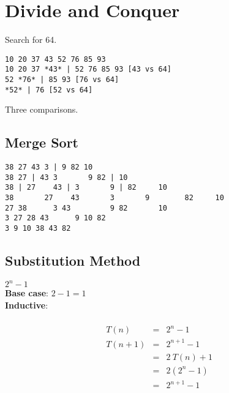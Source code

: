 \documentclass{article}
\begin{document}
\setcounter{section}{2}
\section{Divide and Conquer}
Search for 64.
\begin{verbatim}
10 20 37 43 52 76 85 93
10 20 37 *43* | 52 76 85 93 [43 vs 64]
52 *76* | 85 93 [76 vs 64]
*52* | 76 [52 vs 64]
\end{verbatim}

Three comparisons.

\subsection{Merge Sort}
\begin{verbatim}
38 27 43 3 | 9 82 10
38 27 | 43 3       9 82 | 10
38 | 27    43 | 3       9 | 82     10
38       27    43       3       9        82     10
27 38      3 43         9 82       10
3 27 28 43      9 10 82
3 9 10 38 43 82
\end{verbatim}

\subsection{Substitution Method}
$2^n-1$ \\
\textbf{Base case}: $2-1 = 1$ \\
\textbf{Inductive}:

\begin{eqnarray} \\
T(n) & = & 2^n - 1  \\
T(n + 1) & = & 2^{n + 1} - 1 \\
& = & 2 \ T(n) + 1 \\
& = & 2(2^n - 1) \\
& = & 2^{n+1} - 1
\end{eqnarray}
\end{document}
